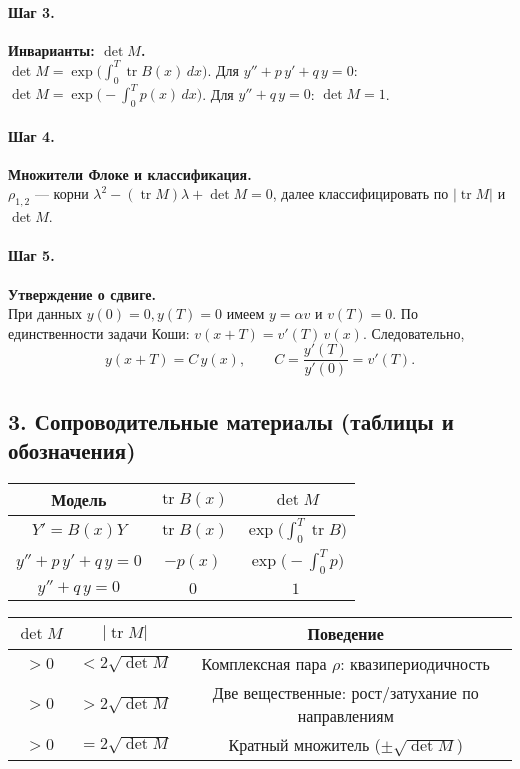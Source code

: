 \paragraph{Шаг 3.} \textbf{Инварианты: \(\det M\).}\\
\(\det M=\exp\!\big(\int_0^T \operatorname{tr}B(x)\,dx\big)\).
Для \(y''+p\,y'+q\,y=0\): \(\det M=\exp\!\big(-\!\int_0^T p(x)\,dx\big)\).
Для \(y''+q\,y=0\): \(\det M=1\).

\paragraph{Шаг 4.} \textbf{Множители Флоке и классификация.}\\
\(\rho_{1,2}\) — корни \( \lambda^2-(\operatorname{tr}M)\lambda+\det M=0\), далее классифицировать по \(|\operatorname{tr}M|\) и \(\det M\).

\paragraph{Шаг 5.} \textbf{Утверждение о сдвиге.}\\
При данных \(y(0)=0,y(T)=0\) имеем \(y=\alpha v\) и \(v(T)=0\).
По единственности задачи Коши: \(v(x+T)=v'(T)\,v(x)\).
Следовательно,
\[
y(x+T)=C\,y(x),\qquad C=\frac{y'(T)}{y'(0)}=v'(T).
\]

\subsection*{3. Сопроводительные материалы (таблицы и обозначения)}

\begin{center}
\begin{tabular}{|c|c|c|}
\hline
\textbf{Модель} & \(\operatorname{tr}B(x)\) & \(\det M\) \\
\hline
\(Y'=B(x)Y\) & \(\operatorname{tr}B(x)\) & \(\exp\!\big(\int_0^T \operatorname{tr}B\big)\) \\
\hline
\(y''+p\,y'+q\,y=0\) & \(-p(x)\) & \(\exp\!\big(-\!\int_0^T p\big)\) \\
\hline
\(y''+q\,y=0\) & \(0\) & \(1\) \\
\hline
\end{tabular}
\end{center}

\begin{center}
\begin{tabular}{|c|c|c|}
\hline
\(\det M\) & \(|\operatorname{tr}M|\) & Поведение \\
\hline
\(>0\) & \(<2\sqrt{\det M}\) & Комплексная пара \(\rho\): квазипериодичность \\
\hline
\(>0\) & \(>2\sqrt{\det M}\) & Две вещественные: рост/затухание по направлениям \\
\hline
\(>0\) & \(=2\sqrt{\det M}\) & Кратный множитель (\(\pm\sqrt{\det M}\)) \\
\hline
\end{tabular}
\end{center}


